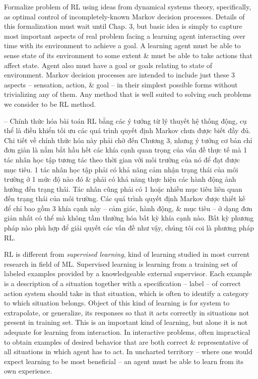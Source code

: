 \documentclass{article}
\begin{document}
\begin{itemize}
\begin{itemize}
        Formalize problem of RL using ideas from dynamical systems theory, specifically, as optimal control of incompletely-known Markov decision processes. Details of this formalization must wait until Chap. 3, but basic idea is simply to capture most important aspects of real problem facing a learning agent interacting over time with its environment to achieve a goal. A learning agent must be able to sense state of its environment to some extent \& must be able to take actions that affect state. Agent also must have a goal or goals relating to state of environment. Markov decision processes are intended to include just these 3 aspects -- sensation, action, \& goal -- in their simplest possible forms without trivializing any of them. Any method that is well suited to solving such problems we consider to be RL method.

        -- Chính thức hóa bài toán RL bằng các ý tưởng từ lý thuyết hệ thống động, cụ thể là điều khiển tối ưu các quá trình quyết định Markov chưa được biết đầy đủ. Chi tiết về chính thức hóa này phải chờ đến Chương 3, nhưng ý tưởng cơ bản chỉ đơn giản là nắm bắt hầu hết các khía cạnh quan trọng của vấn đề thực tế mà 1 tác nhân học tập tương tác theo thời gian với môi trường của nó để đạt được mục tiêu. 1 tác nhân học tập phải có khả năng cảm nhận trạng thái của môi trường ở 1 mức độ nào đó \& phải có khả năng thực hiện các hành động ảnh hưởng đến trạng thái. Tác nhân cũng phải có 1 hoặc nhiều mục tiêu liên quan đến trạng thái của môi trường. Các quá trình quyết định Markov được thiết kế để chỉ bao gồm 3 khía cạnh này -- cảm giác, hành động, \& mục tiêu -- ở dạng đơn giản nhất có thể mà không tầm thường hóa bất kỳ khía cạnh nào. Bất kỳ phương pháp nào phù hợp để giải quyết các vấn đề như vậy, chúng tôi coi là phương pháp RL.

        RL is different from {\it supervised learning}, kind of learning studied in most current research in field of ML. Supervised learning is learning from a training set of labeled examples provided by a knowledgeable external supervisor. Each example is a description of a situation together with a specification -- label -- of correct action system should take in that situation, which is often to identify a category to which situation belongs. Object of this kind of learning is for system to extrapolate, or generalize, its responses so that it acts correctly in situations not present in training set. This is an important kind of learning, but alone it is not adequate for learning from interaction. In interactive problems, often impractical to obtain examples of desired behavior that are both correct \& representative of all situations in which agent has to act. In uncharted territory -- where one would expect learning to be most beneficial -- an agent must be able to learn from its own experience.


\end{itemize}
\end{itemize}
\end{document}

